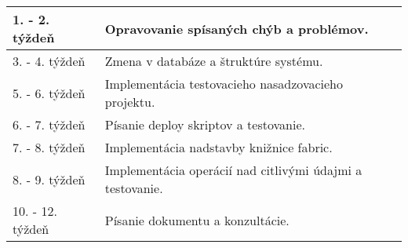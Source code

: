 \begin{tabular}{|l||l|}
\hline
1. - 2. týždeň & Opravovanie spísaných chýb a problémov. \\
\hline
3. - 4. týždeň & Zmena v databáze a štruktúre systému. \\
\hline
5. - 6. týždeň & Implementácia testovacieho nasadzovacieho projektu. \\
\hline
6. - 7. týždeň & Písanie deploy skriptov a testovanie. \\
\hline
7. - 8. týždeň & Implementácia nadstavby knižnice fabric. \\
\hline
8. - 9. týždeň & Implementácia operácií nad citlivými údajmi a testovanie. \\
\hline
10. - 12. týždeň & Písanie dokumentu a konzultácie. \\
\hline
\end{tabular}
